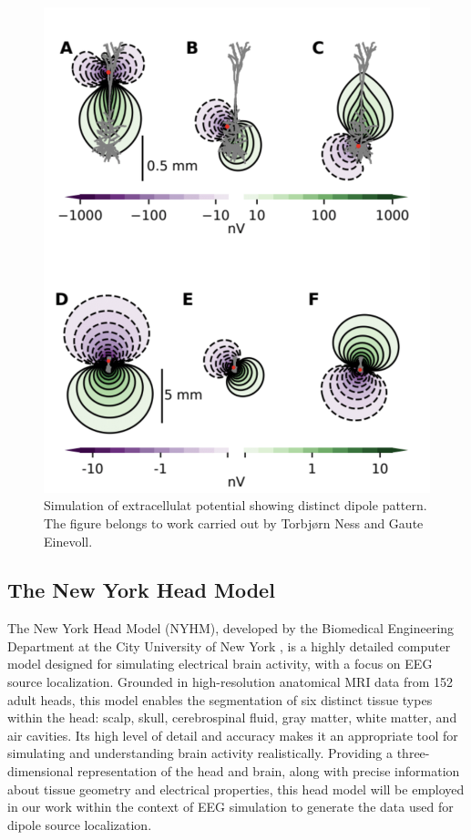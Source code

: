 \documentclass[a4paper, UKenglish, 11pt]{uiomaster}
\begin{document}
\begin{figure}
    \centering
    \includegraphics[width=\linewidth]{figures/dipole_pattern.png}
    \caption{Simulation of extracellulat potential showing distinct dipole pattern. The figure belongs to work carried out by Torbjørn Ness and Gaute Einevoll.}
    \label{fig:dipole_pattern}
\end{figure}



\subsection{The New York Head Model}
The New York Head Model (NYHM), developed by the Biomedical Engineering Department at the City University of New York \cite{huang2016new}, is a highly detailed computer model designed for simulating electrical brain activity, with a focus on EEG source localization. Grounded in high-resolution anatomical MRI data from 152 adult heads, this model enables the segmentation of six distinct tissue types within the head: scalp, skull, cerebrospinal fluid, gray matter, white matter, and air cavities. Its high level of detail and accuracy makes it an appropriate tool for simulating and understanding brain activity realistically. Providing a three-dimensional representation of the head and brain, along with precise information about tissue geometry and electrical properties, this head model will be employed in our work within the context of EEG simulation to generate the data used for dipole source localization.
\end{document}
